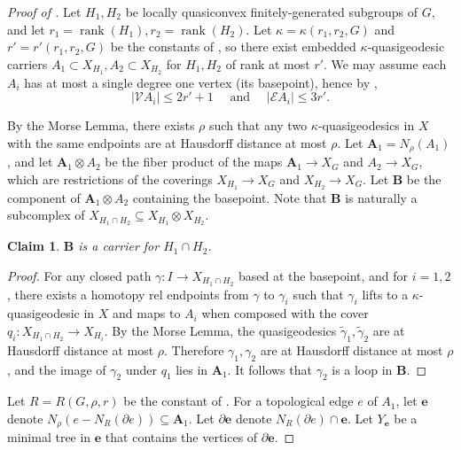 \documentclass[article, 12pt]{amsart}
\numberwithin{equation}{section}
\newtheorem{claim}[theorem]{Claim}
\newtheorem{lemma}[theorem]{Lemma}
\theoremstyle{definition}
\newcommand{\bfA}{\mathbf{A}}
\newcommand{\bfB}{\mathbf{B}}
\newcommand{\bfe}{\mathbf{e}}
\newcommand{\calE}{\mathcal{E}}
\newcommand{\calV}{\mathcal{V}}
\newcommand{\tild}[1]{\widetilde{#1}}
\DeclareMathOperator{\rank}{rank}
\begin{document}
\begin{proof}[Proof of ]
    Let $H_1,H_2$ be locally quasiconvex finitely-generated subgroups of $G$, and let $r_1=\rank (H_1), r_2=\rank(H_2)$. 
    Let $\kappa=\kappa(r_1,r_2,G)$ and $r'=r'(r_1,r_2,G)$ be the constants of , so there exist embedded $\kappa$-quasigeodesic carriers $A_1\subset X_{H_1}, A_2\subset X_{H_2}$ for $H_1,H_2$ of rank at most $r'$.
    We may assume each $A_i$ has at most a single degree one vertex (its basepoint), hence by , $$|\calV A_i|\le 2r'+1\quad \text{ and }\quad |\calE A_i|\le 3r'.$$

    By the Morse Lemma, there exists $\rho$ such that any two $\kappa$-quasigeodesics in $X$ with the same endpoints are at Hausdorff distance at most $\rho$.
    Let $\bfA_1 = N_\rho(A_1)$, and let $\bfA_1\otimes A_2$ be the fiber product of the maps $\bfA_1\to X_G$ and $A_2\to X_G$, which are restrictions of the coverings $X_{H_1}\to X_G$ and $X_{H_2}\to X_G$.
    Let $\bfB$ be the component of $\bfA_1\otimes A_2$ containing the basepoint.
    Note that $\bfB$ is naturally a subcomplex of $X_{H_1\cap H_2} \subseteq X_{H_1}\otimes X_{H_2}$.
    
    \begin{claim}\label{bfB carries}
    $\bfB$ is a carrier for $H_1\cap H_2$.
    \end{claim}
    \begin{proof}
    For any closed path $\gamma:I\to X_{H_1\cap H_2}$ based at the basepoint, and for $i=1,2$, there exists a homotopy rel endpoints from $\gamma$ to $\gamma_i$ such that $\gamma_i$ lifts to a $\kappa$-quasigeodesic in $X$ and maps to $A_i$ when composed with the cover $q_i:X_{H_1\cap H_2}\to X_{H_i}$.
    By the Morse Lemma, the quasigeodesics $\tild \gamma_1, \tild \gamma_2$ are at Hausdorff distance at most $\rho$.
    Therefore $\gamma_1,\gamma_2$ are at Hausdorff distance at most $\rho$, and the image of $\gamma_2$ under $q_1$ lies in $\bfA_1$.
    It follows that $\gamma_2$ is a loop in $\bfB$.
    \end{proof}

     


    Let $R = R(G,\rho,r)$ be the constant of . 
    For a topological edge $e$ of $A_1$, let $\bfe$ denote $N_\rho(e-N_R(\partial e))\subseteq \bfA_1$.
    Let $\partial \bfe$ denote $N_R(\partial e) \cap \bfe$.
    Let $Y_\bfe$ be a minimal tree in $\bfe$ that contains the vertices of $\partial \bfe$. 



\end{proof}
\end{document}
